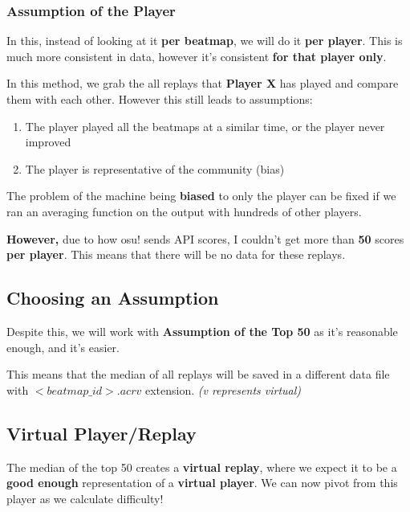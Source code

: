 \subsubsection{Assumption of the Player}
In this, instead of looking at it \textbf{per beatmap}, we will do it \textbf{per player}. This is much more consistent in data, however it's consistent \textbf{for that player only}.

In this method, we grab the all replays that \textbf{Player X} has played and compare them with each other. However this still leads to assumptions:

\begin{enumerate}
	\item The player played all the beatmaps at a similar time, or the player never improved
	\item The player is representative of the community (bias)
\end{enumerate}

The problem of the machine being \textbf{biased} to only the player can be fixed if we ran an averaging function on the output with hundreds of other players.

\textbf{However,} due to how osu! sends API scores, I couldn't get more than \textbf{50} scores \textbf{per player}. This means that there will be no data for these replays.

\subsection{Choosing an Assumption}

Despite this, we will work with \textbf{Assumption of the Top 50} as it's reasonable enough, and it's easier.

This means that the median of all replays will be saved in a different data file with $<beatmap\_id>.acrv$ extension. \textit{(v represents virtual)}

\subsection{Virtual Player/Replay}

The median of the top 50 creates a \textbf{virtual replay}, where we expect it to be a \textbf{good enough} representation of a \textbf{virtual player}. We can now pivot from this player as we calculate difficulty!


